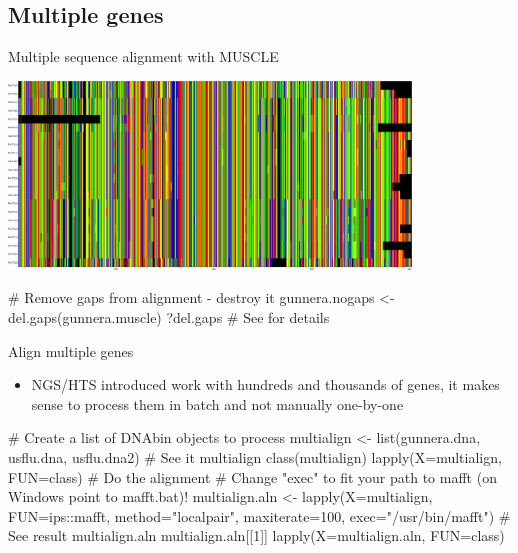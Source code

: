 \documentclass[compress, xelatex, 11pt, xcolor=svgnames, aspectratio=169,
	hyperref={
		bookmarks=true,
		unicode=true,
		colorlinks=true,
		pdftitle={Molecular data in R},
		plainpages=false,
		pdfauthor={Vojtech Zeisek},
		pdfsubject={Course about phylogeny and evolution in R},
		pdfcreator={XeLaTeX},
		pdfkeywords={R, evolution, phylogeny, molecular data},
		linkcolor=Crimson, %
		anchorcolor=Magenta, %
		citecolor=Magenta, %
		filecolor=Magenta, %
		menucolor=Magenta, %
		urlcolor=DodgerBlue, %
		},
	url={hyphens, lowtilde} %
	]{beamer}
\begin{document}
\subsection{Multiple genes}

\begin{frame}[fragile]{Multiple sequence alignment with MUSCLE}
	\begin{center}
		\includegraphics[height=5cm]{muscle.png}
	\end{center}
	\vfil
	\begin{spluscode}
    # Remove gaps from alignment - destroy it
    gunnera.nogaps <- del.gaps(gunnera.muscle)
    ?del.gaps # See for details
	\end{spluscode}
	\vfill
\end{frame}

\begin{frame}[fragile]{Align multiple genes}
	\begin{itemize}
		\item NGS/HTS introduced work with hundreds and thousands of genes, it makes sense to process them in batch and not manually one-by-one
	\end{itemize}
	\begin{spluscode}
    # Create a list of DNAbin objects to process
    multialign <- list(gunnera.dna, usflu.dna, usflu.dna2)
    # See it
    multialign
    class(multialign)
    lapply(X=multialign, FUN=class)
    # Do the alignment
    # Change "exec" to fit your path to mafft (on Windows point to mafft.bat)!
    multialign.aln <- lapply(X=multialign, FUN=ips::mafft, method="localpair",
      maxiterate=100, exec="/usr/bin/mafft")
    # See result
    multialign.aln
    multialign.aln[[1]]
    lapply(X=multialign.aln, FUN=class)
	\end{spluscode}
\end{frame}
\end{document}
